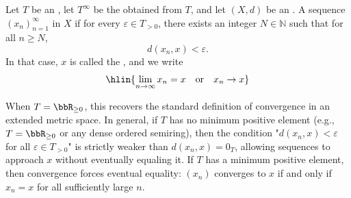 \begin{definition} \label{definition:convergence_and_limit_of_sequence_in_extended_metric_space}
    Let $T$ be an , let $T^\infty$ be the  obtained from $T$, and let $(X, d)$ be an .
    A sequence $(x_n)_{n=1}^\infty$ in $X$  if for every $\varepsilon \in T_{>0}$, there exists an integer $N \in \mathbb{N}$ such that for all $n \geq N$,
    $$d(x_n, x) < \varepsilon.$$
    In that case, $x$ is called the , and we write
    $$\hlin{\lim_{n \to \infty} x_n = x \quad \text{or} \quad x_n \to x}$$

    When $T = \bbR_{\geq 0}$, this recovers the standard definition of convergence in an extended metric space. In general, if $T$ has no minimum positive element (e.g., $T = \bbR_{\geq 0}$ or any dense ordered semiring), then the condition "$d(x_n,x) < \varepsilon$ for all $\varepsilon \in T_{>0}$" is strictly weaker than $d(x_n,x) = 0_T$, allowing sequences to approach $x$ without eventually equaling it. If $T$ has a minimum positive element, then convergence forces eventual equality: $(x_n)$ converges to $x$ if and only if $x_n = x$ for all sufficiently large $n$.

\end{definition}
